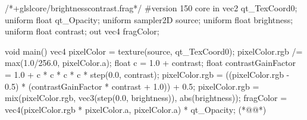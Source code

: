 \label{f000077}    %
\FloatBarrier                                  %
\begin{thebookfilesourceone}[escapeinside={(*@}{@*)},
caption=GoodLuck,
title=\filesourcenumbernameone \thefilesourcenumber
]
/*+glslcore/brightnesscontrast.frag*/
#version 150 core
in vec2 qt_TexCoord0;
uniform float qt_Opacity;
uniform sampler2D source;
uniform float brightness;
uniform float contrast;
out vec4 fragColor;

void main() {
    vec4 pixelColor = texture(source, qt_TexCoord0);
    pixelColor.rgb /= max(1.0/256.0, pixelColor.a);
    float c = 1.0 + contrast;
    float contrastGainFactor = 1.0 + c * c * c * c * step(0.0, contrast);
    pixelColor.rgb =
        ((pixelColor.rgb - 0.5) * (contrastGainFactor * contrast + 1.0)) + 0.5;
    pixelColor.rgb =
        mix(pixelColor.rgb, vec3(step(0.0, brightness)), abs(brightness));
    fragColor = vec4(pixelColor.rgb * pixelColor.a, pixelColor.a) * qt_Opacity;
}(*@\marginpar[\hfill\setlength\fboxsep{2pt}\fbox{\footnotesize{\kaishu\parbox{1em}{\setlength{\baselineskip}{2pt}\filesourcenumbernameone}}\footnotesize{\thefilesourcenumber}}]{\setlength\fboxsep{2pt}\fbox{\footnotesize{\kaishu\parbox{1em}{\setlength{\baselineskip}{2pt}\filesourcenumbernameone}}\footnotesize{\thefilesourcenumber}}}@*)\end{thebookfilesourceone}          %
\addtocounter{lstlisting}{-1}   %




























